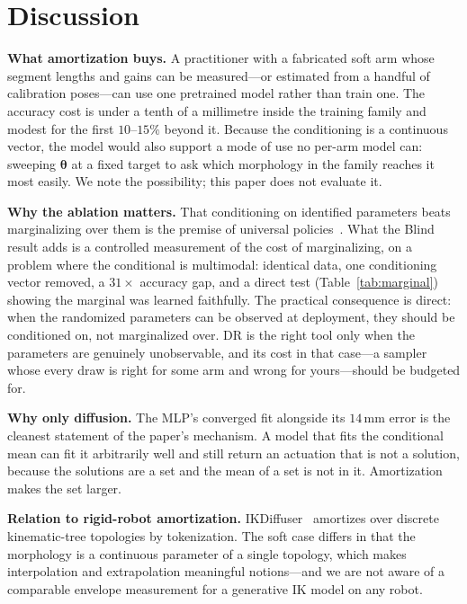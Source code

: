 \documentclass[robotics,article,submit,moreauthors]{Definitions/mdpi}
\begin{document}
\section{Discussion}

\textbf{What amortization buys.} A practitioner with a fabricated soft arm
whose segment lengths and gains can be measured---or estimated from a
handful of calibration poses---can use one pretrained model rather than
train one. The accuracy cost is under a tenth of a millimetre inside the
training family and modest for the first $10$--$15\%$ beyond it. Because the conditioning is a continuous
vector, the model would also support a mode of use no per-arm model can:
sweeping $\boldsymbol{\theta}$ at a fixed target to ask which morphology
in the family reaches it most easily. We note the possibility; this paper
does not evaluate it.

\textbf{Why the ablation matters.} That conditioning on identified
parameters beats marginalizing over them is the premise of universal
policies~\cite{yu2017preparing}. What the Blind result adds is a
controlled measurement of the cost of marginalizing, on a problem where
the conditional is multimodal: identical data, one conditioning vector
removed, a $31\times$ accuracy gap, and a direct test
(Table~\ref{tab:marginal}) showing the marginal was learned faithfully.
The practical consequence is direct: when the randomized parameters can be
observed at deployment, they should be conditioned on, not marginalized
over. DR is the right tool only when the parameters are genuinely
unobservable, and its cost in that case---a sampler whose every draw is
right for some arm and wrong for yours---should be budgeted for.

\textbf{Why only diffusion.} The MLP's converged fit alongside its
$14\,$mm error is the cleanest statement of the paper's mechanism. A model
that fits the conditional mean can fit it arbitrarily well and still return
an actuation that is not a solution, because the solutions are a set and
the mean of a set is not in it. Amortization makes the set larger.

\textbf{Relation to rigid-robot amortization.} IKDiffuser~\cite{zhang2025ikdiffuser}
amortizes over discrete kinematic-tree topologies by tokenization. The soft
case differs in that the morphology is a continuous parameter of a single
topology, which makes interpolation and extrapolation meaningful
notions---and we are not aware of a comparable envelope measurement for
a generative IK model on any robot.
\end{document}
